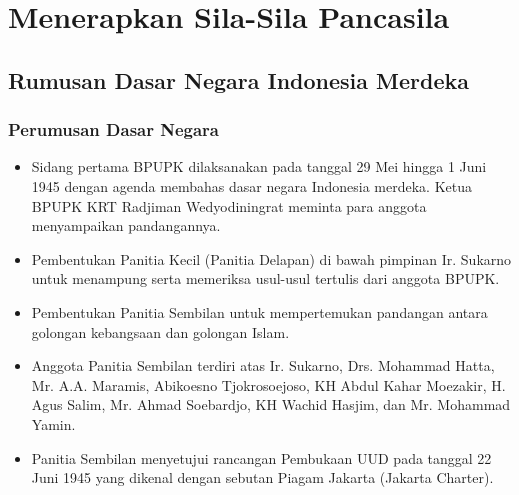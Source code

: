 \section{Menerapkan Sila-Sila Pancasila}

\subsection{Rumusan Dasar Negara Indonesia Merdeka}

\subsubsection{Perumusan Dasar Negara}
\begin{itemize}
\item Sidang pertama BPUPK dilaksanakan pada tanggal 29 Mei hingga 1 Juni 1945 dengan agenda membahas dasar negara Indonesia merdeka. Ketua BPUPK KRT Radjiman Wedyodiningrat meminta para anggota menyampaikan pandangannya.
\item Pembentukan Panitia Kecil (Panitia Delapan) di bawah pimpinan Ir. Sukarno untuk menampung serta memeriksa usul-usul tertulis dari anggota BPUPK.
\item Pembentukan Panitia Sembilan untuk mempertemukan pandangan antara golongan kebangsaan dan golongan Islam.
\item Anggota Panitia Sembilan terdiri atas Ir. Sukarno, Drs. Mohammad Hatta, Mr. A.A. Maramis, Abikoesno Tjokrosoejoso, KH Abdul Kahar Moezakir, H. Agus Salim, Mr. Ahmad Soebardjo, KH Wachid Hasjim, dan Mr. Mohammad Yamin.
\item Panitia Sembilan menyetujui rancangan Pembukaan UUD pada tanggal 22 Juni 1945 yang dikenal dengan sebutan Piagam Jakarta (Jakarta Charter).
\end{itemize}

